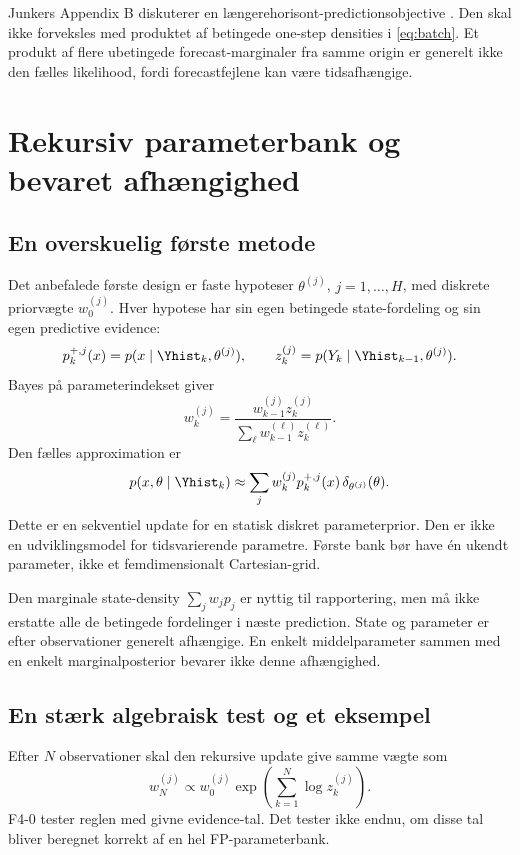 Junkers Appendix B diskuterer en længerehorisont-predictionsobjective \cite{junker}. Den skal ikke forveksles med produktet af betingede one-step densities i \eqref{eq:batch}. Et produkt af flere ubetingede forecast-marginaler fra samme origin er generelt ikke den fælles likelihood, fordi forecastfejlene kan være tidsafhængige.

\section{Rekursiv parameterbank og bevaret afhængighed}
\subsection{En overskuelig første metode}
Det anbefalede første design er faste hypoteser \(\theta^{(j)}\), \(j=1,\ldots,H\), med diskrete priorvægte \(w_0^{(j)}\). Hver hypotese har sin egen betingede state-fordeling og sin egen predictive evidence:
\[
 p_k^{+,j}(x)=p(x\mid\Yhist_k,\theta^{(j)}),\qquad
 z_k^{(j)}=p(Y_k\mid\Yhist_{k-1},\theta^{(j)}).
\]
Bayes på parameterindekset giver
\begin{equation}
 \boxed{w_k^{(j)}=\frac{w_{k-1}^{(j)}z_k^{(j)}}
 {\sum_\ell w_{k-1}^{(\ell)}z_k^{(\ell)}}.}
 \label{eq:bank}
\end{equation}
Den fælles approximation er
\begin{equation}
 p(x,\theta\mid\Yhist_k)\approx
 \sum_jw_k^{(j)}p_k^{+,j}(x)\,\delta_{\theta^{(j)}}(\theta).
 \label{eq:jointbank}
\end{equation}
Dette er en sekventiel update for en statisk diskret parameterprior. Den er ikke en udviklingsmodel for tidsvarierende parametre. Første bank bør have én ukendt parameter, ikke et femdimensionalt Cartesian-grid.

Den marginale state-density \(\sum_jw_jp_j\) er nyttig til rapportering, men må ikke erstatte alle de betingede fordelinger i næste prediction. State og parameter er efter observationer generelt afhængige. En enkelt middelparameter sammen med en enkelt marginalposterior bevarer ikke denne afhængighed.

\subsection{En stærk algebraisk test og et eksempel}
Efter \(N\) observationer skal den rekursive update give samme vægte som
\begin{equation}
 w_N^{(j)}\propto w_0^{(j)}\exp\!\left(\sum_{k=1}^N\log z_k^{(j)}\right).
 \label{eq:bankreplay}
\end{equation}
F4-0 tester reglen med givne evidence-tal. Det tester ikke endnu, om disse tal bliver beregnet korrekt af en hel FP-parameterbank.

